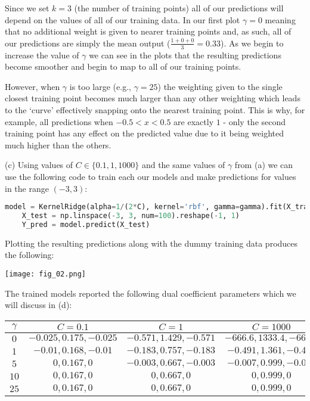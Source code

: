 \documentclass[12pt]{article}
\begin{document}
Since we set $k = 3$ (the number of training points) all of our predictions will depend on the values of all of our training data. In our first plot $\gamma = 0$ meaning that no additional weight is given to nearer training points and, as such, all of our predictions are simply the mean output ($\frac{1+0+0}{3} = 0.33$). As we begin to increase the value of $\gamma$ we can see in the plots that the resulting predictions become smoother and begin to map to all of our training points.

However, when $\gamma$ is too large (e.g., $\gamma = 25$) the weighting given to the single closest training point becomes much larger than any other weighting which leads to the `curve' effectively snapping onto the nearest training point. This is why, for example, all predictions when $-0.5 < x < 0.5$ are exactly $1$ - only the second training point has any effect on the predicted value due to it being weighted much higher than the others.

\noindent (c) Using values of $C \in \{ 0.1, 1, 1000 \}$ and the same values of $\gamma$ from (a) we can use the following code to train each our models and make predictions for values in the range $(-3, 3)$:

\begin{center}
    \lstset{basicstyle=\footnotesize}
    \begin{lstlisting}[language=Python]
    model = KernelRidge(alpha=1/(2*C), kernel='rbf', gamma=gamma).fit(X_train, Y_train)
    X_test = np.linspace(-3, 3, num=100).reshape(-1, 1)
    Y_pred = model.predict(X_test)
    \end{lstlisting}
\end{center}

Plotting the resulting predictions along with the dummy training data produces the following:

\begin{center}
    \texttt{[image: fig\_02.png]}
\end{center}

The trained models reported the following dual coefficient parameters which we will discuss in (d):

\begin{center}
    \begin{tabular}{|c|c|c|c|}
        \hline
        $\gamma$ & $C = 0.1$ & $C = 1$ & $C = 1000$ \\
        \hline
        $0$ & $-0.025, 0.175, -0.025$ & $-0.571, 1.429, -0.571$ & $-666.6, 1333.4, -666.6$ \\
        $1$ & $-0.01, 0.168, -0.01$ & $-0.183, 0.757, -0.183$ & $-0.491, 1.361, -0.491$ \\
        $5$ & $0, 0.167, 0$ & $-0.003, 0.667, -0.003$ & $-0.007, 0.999, -0.007$ \\
        $10$ & $0, 0.167, 0$ & $0, 0.667, 0$ & $0, 0.999, 0$ \\
        $25$ & $0, 0.167, 0$ & $0, 0.667, 0$ & $0, 0.999, 0$ \\
        \hline
    \end{tabular}
\end{center}
\end{document}
